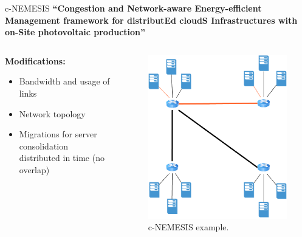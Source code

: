 \documentclass[Ligatures=TeX,table,svgnames,usetotalslideindicator,compress,10pt,aspectratio=169]{beamer}
\begin{document}
\addtocounter{framenumber}{-1}

\begin{frame}{c-NEMESIS}  
  \textbf {``\alert{Congestion} and \alert{N}etwork-aware \alert{E}nergy-efficient
    \alert{M}anagement framework for distribut\alert{E}d cloud\alert{S} \alert{I}nfrastructures with on-\alert{S}ite photovoltaic production''}
  \begin{columns}        
    \begin{column}{0.7\textwidth}
\small
\textbf{Modifications:}
\begin{itemize}
    \item Bandwidth and usage of links
    \item Network topology
    \item Migrations for server consolidation distributed in time (no overlap)

  \end{itemize}
  
\end{column}   

\begin{column}{0.3\textwidth}
      \begin{figure}[!h]
        \centering
        \includegraphics[width=.9\textwidth]{images/cnemesis_2.pdf}
        \caption{c-NEMESIS example.}
      \end{figure}
    \end{column}        

\end{columns}

\end{frame}
\addtocounter{framenumber}{-1}
\end{document}
